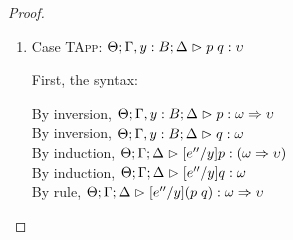 \begin{proof}
\begin{enumerate}
  First, the syntax:
  \begin{tabbedproof}
    \oo By inversion, $\judgeA[\Theta, \beta:\kappa'; \Gamma, y:B; \Delta]{p}{\upsilon}$ \\
    \oo By induction, $\judgeA[\Theta, \beta:\kappa'; \Gamma; \Delta]{[e''/y]p}{\upsilon}$ \\
    \oo By rule, $\judgeA{\pfunall{\beta}{\kappa'}{[e''/y]p}}{\forallsort{\beta}{\kappa'}{\upsilon}}$ \\
    \oo By def of subst, $\judgeA{[e''/y](\pfunall{\beta}{\kappa'}{p})}{\forallsort{\beta}{\kappa'}{\upsilon}}$ \\
  \end{tabbedproof}
  For semantics, consider $\interp{\judgeA{[e''/y](\pfun{\beta}{\kappa'}{p})}{\forallsort{\beta}{\kappa'}{\upsilon}}}\;\theta\;\gamma\;\delta$ \\
  \begin{eqnproof}
          {Semantics}
          {Induction}
          {Strengthening}
          {Semantics}
  \end{eqnproof}
  This case relies upon the fact that $\Gamma$ and $\Delta$ do not have $\beta$ free and the 
  equality of sorts under substitution. 



\item Case \textsc{TApp}: $\judgeA[\Theta; \Gamma, y:B; \Delta]{p\;q}{\upsilon}$
  
  First, the syntax:
  \begin{tabbedproof}
    \oo By inversion, $\judgeA[\Theta; \Gamma, y:B; \Delta]{p}{\omega \To \upsilon}$\\
    \oo By inversion, $\judgeA[\Theta; \Gamma, y:B; \Delta]{q}{\omega}$\\
    \oo By induction, $\judgeA[\Theta; \Gamma; \Delta]{[e''/y]p}{(\omega \To \upsilon)}$\\
    \oo By induction, $\judgeA[\Theta; \Gamma; \Delta]{[e''/y]q}{\omega}$\\
    \oo By rule, $\judgeA[\Theta; \Gamma; \Delta]{[e''/y](p\;q)}{\omega \To \upsilon}$\\
  \end{tabbedproof}


\end{enumerate}
\end{proof}
